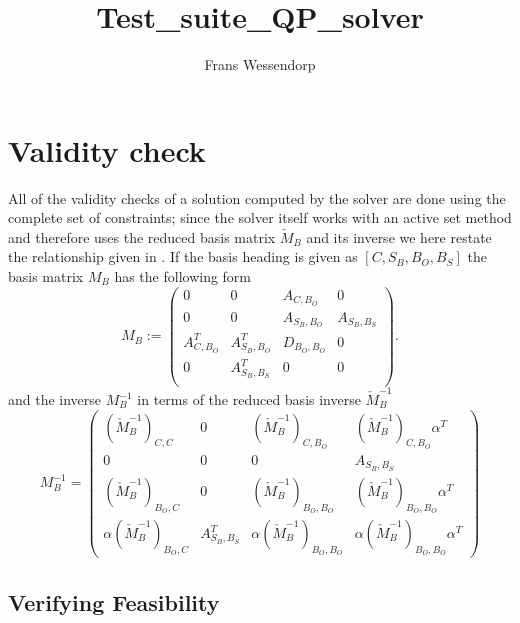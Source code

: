 \documentclass[a4paper]{article}
\title{Test\_suite\_QP\_solver}
\author{Frans Wessendorp}
\begin{document}
\maketitle
\section{Validity check}
All of the validity checks of a solution computed by the solver are done using
the complete set of constraints; since the solver itself works with an active
set method and therefore uses the reduced basis matrix $\check{M}_{B}$
and its inverse we here restate the relationship given in \cite{Frans_Deg}. 
If the basis heading is given as
$\left[C, S_{B}, B_{O}, B_{S} \right]$ the basis matrix
$M_{B}$ has the following form
\begin{equation}
\label{def:basis_matrix}
M_{B}:=
\left(\begin{array}{c|c|c|c}
        0 & 0 & A_{C, B_{O}} & 0 \\
        \hline
	0 & 0 & A_{S_{B}, B_{O}} & A_{S_{B}, B_{S}} \\
	\hline
        A_{C, B_{O}}^{T} & A_{S_{B}, B_{O}}^{T} & D_{B_{O}, B_{O}}
	  & 0 \\
        \hline
        0 & A_{S_{B}, B_{S}}^{T} & 0
	  & 0 \\
      \end{array}
\right).
\end{equation}
and the inverse $M_{B}^{-1}$ in terms of the reduced basis inverse
$\check{M}_{B}^{-1}$
\begin{equation}
\label{eq:M_B_inv_exp}
M_{B}^{-1}=
\left(\begin{array}{c|c|c|c}
        \left(\check{M}_{B}^{-1}\right)_{C,C} &
	0 &
	\left(\check{M}_{B}^{-1}\right)_{C,B_{O}} &
	 \left(\check{M}_{B}^{-1}\right)_{C, B_{O}}\alpha^{T} \\
	\hline
	0 &
	0 &
	0 &
	A_{S_{B},B_{S}} \\
	\hline
	\left(\check{M}_{B}^{-1}\right)_{B_{O}, C} &
	0 &
	\left(\check{M}_{B}^{-1}\right)_{B_{O}, B_{O}} &
          \left(\check{M}_{B}^{-1}\right)_{B_{O},B_{O}}\alpha^{T} \\
	\hline
	\alpha\left(\check{M}_{B}^{-1}\right)_{B_{O},
	C} &
	A_{S_{B}, B_{S}}^{T} &
	\alpha\left(\check{M}_{B}^{-1}\right)_{B_{O},
	B_{O}} &
	\alpha\left(\check{M}_{B}^{-1}\right)_{B_{O}, B_{O}}\alpha^{T}
      \end{array}
\right)
\end{equation}


\subsection{Verifying Feasibility}
\end{document}
